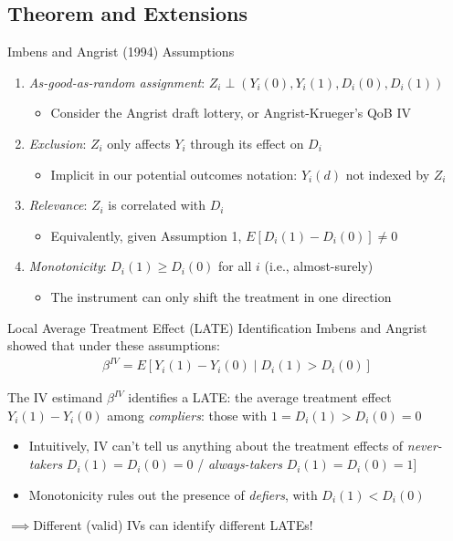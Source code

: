 \documentclass{beamer}
\begin{document}
\subsection{Theorem and Extensions}
\begin{frame}{Imbens and Angrist (1994) Assumptions}
\begin{enumerate}
\item \emph{As-good-as-random assignment}: $Z_i\perp (Y_i(0),Y_i(1),D_i(0),D_i(1))$\smallskip
\begin{itemize}
\item Consider the Angrist draft lottery, or Angrist-Krueger's QoB IV
\end{itemize}\medskip\pause{}
\item \emph{Exclusion}: $Z_i$ only affects $Y_i$ through its effect on $D_i$\smallskip
\begin{itemize}
\item Implicit in our potential outcomes notation: $Y_i(d)$ not indexed by $Z_i$
\end{itemize}\medskip\pause{}
\item \emph{Relevance}: $Z_i$ is correlated with $D_i$\smallskip
\begin{itemize}
\item Equivalently, given Assumption 1, $E[D_{i}(1)-D_i(0)]\neq 0$
\end{itemize}\medskip\pause{}
\item \emph{Monotonicity}: $D_{i}(1)\ge D_{i}(0)$ for all $i$ (i.e., almost-surely)\smallskip
\begin{itemize}
\item The instrument can only shift the treatment in one direction
\end{itemize}
\end{enumerate}
\end{frame}

\begin{frame}{Local Average Treatment Effect (LATE) Identification}
Imbens and Angrist showed that under these assumptions:
\begin{align*}
\beta^{IV}=E[Y_i(1)-Y_i(0)\mid D_i(1)>D_i(0)]
\end{align*}
\vspace{-0.6cm}

The IV estimand $\beta^{IV}$ identifies a LATE: the average treatment effect $Y_i(1)-Y_i(0)$ among \emph{compliers}: those with $1=D_i(1)>D_i(0)=0$\smallskip\pause{}
\begin{itemize}
\item Intuitively, IV can't tell us anything about the treatment effects of \emph{never-takers} $D_i(1)=D_i(0)=0$ / \emph{always-takers} $D_i(1)=D_i(0)=1$]\smallskip\pause{}
\item Monotonicity rules out the presence of \emph{defiers}, with $D_i(1)<D_i(0)$\pause{}
\end{itemize}\medskip
\begin{center}$\implies$Different (valid) IVs can identify different LATEs! \end{center}
\end{frame}
\end{document}
